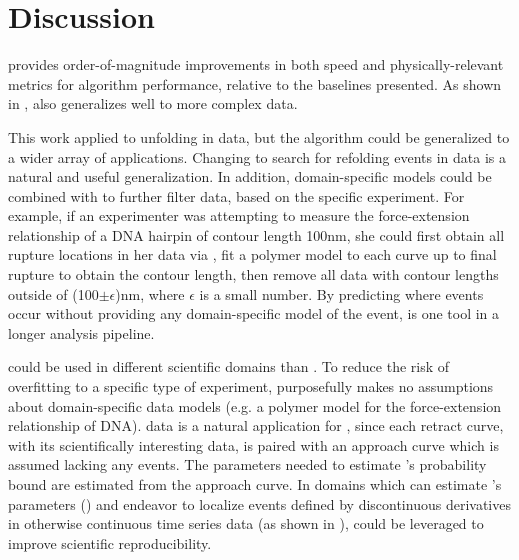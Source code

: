 \section{Discussion}


\firstp \pl \name{} provides order-of-magnitude improvements in both speed and physically-relevant metrics for algorithm performance, relative to the baselines presented. As shown in , \name{} also generalizes well to more complex \singlemol{} data.  \pl

This work applied \name{} to unfolding in \singlemol{} data, but the algorithm could be generalized to a wider array of applications. Changing \name{} to search for refolding events in \singlemol{} data is a natural and useful generalization. In addition, domain-specific models could be combined with \name{} to further filter data, based on the specific experiment. For example, if an experimenter was attempting to measure the force-extension relationship of a DNA hairpin of contour length 100nm, she could first obtain all rupture locations in her data via \name{}, fit a polymer model to each curve up to final rupture to obtain the contour length, then remove all data with contour lengths outside of (100$\pm \epsilon$)nm, where $\epsilon$ is a small number. By predicting where events occur without providing any domain-specific model of the event, \name{} is one tool in a longer \singlemol{} analysis pipeline.

\name{} could be used in different scientific domains than \singlemol{}. To reduce the risk of overfitting to a specific type of \singlemol{} experiment, \name{} purposefully makes no assumptions about domain-specific data models (e.g. a polymer model for the force-extension relationship of DNA). \singlemol{} data is a natural application for \name{}, since each retract curve, with its scientifically interesting data, is paired with an approach curve which is assumed lacking any events. The parameters needed to estimate \name{}'s probability bound are estimated from the approach curve. In domains which can estimate \name{}'s parameters () and endeavor to localize events defined by discontinuous derivatives in otherwise continuous time series data (as shown in ), \name{} could be leveraged to improve scientific reproducibility.
